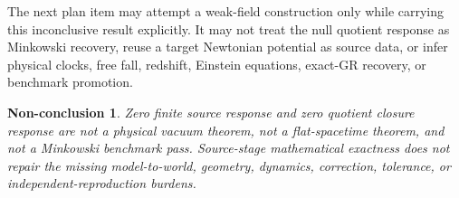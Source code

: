 \documentclass[11pt]{article}
\newtheorem{nonconclusion}{Non-conclusion}
\begin{document}
The next plan item may attempt a weak-field construction only while carrying
this inconclusive result explicitly.  It may not treat the null quotient
response as Minkowski recovery, reuse a target Newtonian potential as source
data, or infer physical clocks, free fall, redshift, Einstein equations,
exact-GR recovery, or benchmark promotion.

\begin{nonconclusion}
Zero finite source response and zero quotient closure response are not a
physical vacuum theorem, not a flat-spacetime theorem, and not a Minkowski
benchmark pass.  Source-stage mathematical exactness does not repair the
missing model-to-world, geometry, dynamics, correction, tolerance, or
independent-reproduction burdens.
\end{nonconclusion}
\end{document}

